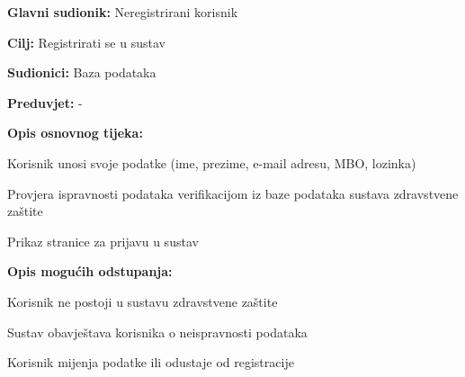 				\noindent {}
				\begin{packed_item}
					
					\item \textbf{Glavni sudionik: }Neregistrirani korisnik
					\item  \textbf{Cilj: }Registrirati se u sustav
					\item  \textbf{Sudionici: }Baza podataka
					\item  \textbf{Preduvjet: } -  
					\item  \textbf{Opis osnovnog tijeka: }
					
					\item[] \begin{packed_enum}
						
						\item Korisnik unosi svoje podatke (ime, prezime, e-mail adresu, MBO, lozinka)
						\item Provjera ispravnosti podataka verifikacijom iz baze podataka sustava zdravstvene zaštite
						\item Prikaz stranice za prijavu u sustav
					\end{packed_enum}
					
					\item  \textbf{Opis mogućih odstupanja:}
					
					\item[] \begin{packed_item}
						
						\item[2.a] Korisnik ne postoji u sustavu zdravstvene zaštite
						\item[] \begin{packed_enum}
							
							\item Sustav obavještava korisnika o neispravnosti podataka
							\item Korisnik mijenja podatke ili odustaje od registracije
							
						\end{packed_enum}
						
					\end{packed_item}
				\end{packed_item}
				

